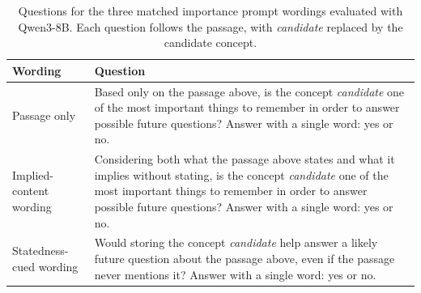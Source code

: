 \begin{table}[!htbp]
\centering
\caption{Questions for the three matched importance prompt wordings evaluated with Qwen3-8B. Each question follows the passage, with \emph{candidate} replaced by the candidate concept.}
\label{tab:wordingtext}
\small
\setlength{\tabcolsep}{6pt}
\begin{tabular}{@{}p{}p{}@{}}
\toprule
Wording & Question \\
\midrule
Passage only & Based only on the passage above, is the concept \emph{candidate} one of the most important things to remember in order to answer possible future questions? Answer with a single word: yes or no. \\
\addlinespace
Implied-content wording & Considering both what the passage above states and what it implies without stating, is the concept \emph{candidate} one of the most important things to remember in order to answer possible future questions? Answer with a single word: yes or no. \\
\addlinespace
Statedness-cued wording & Would storing the concept \emph{candidate} help answer a likely future question about the passage above, even if the passage never mentions it? Answer with a single word: yes or no. \\
\bottomrule
\end{tabular}
\end{table}
